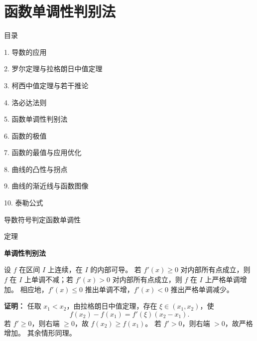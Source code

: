 \documentclass[aspectratio=169,10pt,fontset=fandol]{ctexbeamer}
\begin{document}
\section{函数单调性判别法}
\begin{frame}[t,fragile]{目录}
\normalsize
{\color{black}\normalsize 1. 导数的应用\par}\vspace{0.22em}
{\color{black}\normalsize 2. 罗尔定理与拉格朗日中值定理\par}\vspace{0.22em}
{\color{black}\normalsize 3. 柯西中值定理与若干推论\par}\vspace{0.22em}
{\color{black}\normalsize 4. 洛必达法则\par}\vspace{0.22em}
{\color{blue}\normalsize 5. 函数单调性判别法\par}\vspace{0.22em}
{\color{gray!40}\normalsize 6. 函数的极值\par}\vspace{0.22em}
{\color{gray!40}\normalsize 7. 函数的最值与应用优化\par}\vspace{0.22em}
{\color{gray!40}\normalsize 8. 曲线的凸性与拐点\par}\vspace{0.22em}
{\color{gray!40}\normalsize 9. 曲线的渐近线与函数图像\par}\vspace{0.22em}
{\color{gray!40}\normalsize 10. 泰勒公式\par}\vspace{0.22em}
\end{frame}
\begin{frame}[t,fragile]{导数符号判定函数单调性}
\normalsize
\begin{block}{定理}
{\normalsize
\textbf{单调性判别法}\par

设 $f$ 在区间 $I$ 上连续，在 $I$ 的内部可导。 若 $f'(x)\geq0$ 对内部所有点成立，则 $f$ 在 $I$ 上单调不减；若 $f'(x)>0$ 对内部所有点成立，则 $f$ 在 $I$ 上严格单调增加。 相应地，$f'(x)\leq0$ 推出单调不增，$f'(x)<0$ 推出严格单调减少。

}
\end{block}
\pause
{\normalsize
\textbf{证明：}
任取 $x_1<x_2$，由拉格朗日中值定理，存在 $\xi\in(x_1,x_2)$，使
\[
f(x_2)-f(x_1)=f'(\xi)(x_2-x_1).
\]
若 $f'\geq0$，则右端 $\geq0$，故 $f(x_2)\geq f(x_1)$。 若 $f'>0$，则右端 $>0$，故严格增加。 其余情形同理。

}
\end{frame}
\end{document}
